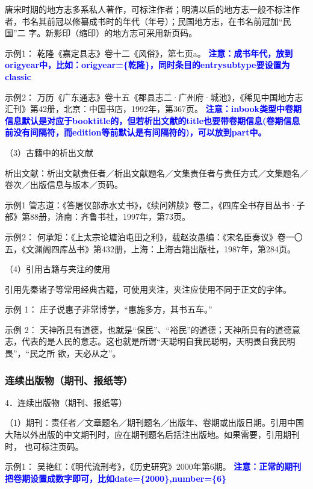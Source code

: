 \documentclass{article}
\newcommand{\qd}[1]{\textbf{\textcolor{blue}{#1}}}
\begin{document}
唐宋时期的地方志多系私人著作，可标注作者；明清以后的地方志一般不标注作者，书名其前冠以修纂成书时的年代（年号）；民国地方志，在书名前冠加“民国”二
字。新影印（缩印）的地方志可采用新页码。

示例1：
乾隆《嘉定县志》卷十二《风俗》，第七页a。
 \qd{注意：成书年代，放到origyear中，比如：origyear=\{乾隆\}，同时条目的entrysubtype要设置为classic}

示例2：
万历《广东通志》卷十五《郡县志二·广州府·城池》，《稀见中国地方志汇刊》第42册，北京：中国书店，1992年，第367页。
\qd{注意：inbook类型中卷期信息默认是对应于booktitle的，但若析出文献的title也要带卷期信息(卷期信息前没有间隔符，而edition等前默认是有间隔符的)，可以放到part中。}



（3）古籍中的析出文献

析出文献：析出文献责任者／析出文献题名／文集责任者与责任方式／文集题名／卷次／出版信息与版本／页码。

示例1
管志道：《答屠仪部赤水丈书》，《续问辨牍》卷二，《四库全书存目丛书·子部》第88册，济南：齐鲁书社，1997年，第73页。

示例2：
何承矩：《上太宗论塘泊屯田之利》，载赵汝愚编：《宋名臣奏议》卷一〇五，《文渊阁四库丛书》第432册，上海：上海古籍出版社，1987年，第284页。


（4）引用古籍与夹注的使用

引用先秦诸子等常用经典古籍，可使用夹注，夹注应使用不同于正文的字体。

 示例 1：
 庄子说惠子非常博学，“惠施多方，其书五车。”

 示例 2：
 天神所具有道德，也就是“保民”、“裕民”的道德；天神所具有的道德意志，代表的是人民的意志。这也就是所谓“天聪明自我民聪明，天明畏自我民明畏”，“民之所 欲，天必从之”。


\subsubsection{连续出版物（期刊、报纸等）}
4．连续出版物（期刊、报纸等）

（1）期刊：责任者／文章题名／期刊题名／出版年、卷期或出版日期。引用中国大陆以外出版的中文期刊时，应在期刊题名后括注出版地。如果需要，引用期刊时，
也可标注页码。

示例1：
吴艳红：《明代流刑考》，《历史研究》2000年第6期。
 \qd{注意：正常的期刊把卷期设置成数字即可，比如date=\{2000\},number=\{6\}}
\end{document}
